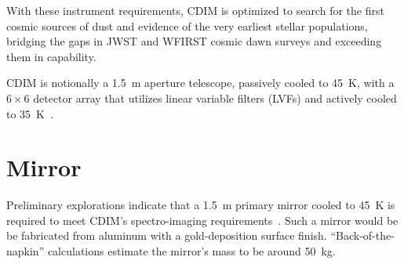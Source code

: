 \documentclass{ws-jai}
\begin{document}
With these instrument requirements, CDIM is optimized to search for the first cosmic sources of dust and evidence of the very earliest stellar populations, bridging the gaps in JWST and WFIRST cosmic dawn surveys and exceeding them in capability.

CDIM is notionally a \SI{1.5}{\meter} aperture telescope, passively cooled to \SI{45}{\kelvin}, with a $6\times6$ detector array that utilizes linear variable filters (LVFs) and actively cooled to \SI{35}{\kelvin}~\cite{cooray2016cdim2page}.



\section{Mirror}
\label{S:mirror}
Preliminary explorations indicate that a \SI{1.5}{\meter} primary mirror cooled to \SI{45}{\kelvin} is required to meet CDIM's spectro-imaging requirements~\cite{cooray2016cdim2page}.
Such a mirror would be be fabricated from aluminum with a gold-deposition surface finish.
``Back-of-the-napkin'' calculations estimate the mirror's mass to be around \SI{50}{\kilo\gram}.
\end{document}

